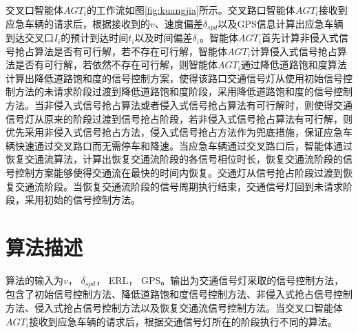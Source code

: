
交叉口智能体${AGT_i}$的工作流如图\ref{fig:kuangjia}所示。交叉路口智能体${AGT_i}$接收到应急车辆的请求后，根据接收到的${v}$、速度偏差${\delta_{spd}}$以及GPS信息计算出应急车辆到达交叉口${I_i}$的预计到达时间${t_i}$以及时间偏差${\delta_{i}}$。智能体${AGT_i}$首先计算非侵入式信号抢占算法是否有可行解，若不存在可行解，智能体${AGT_i}$计算侵入式信号抢占算法是否有可行解，若依然不存在可行解，则智能体${AGT_i}$通过降低道路饱和度算法计算出降低道路饱和度的信号控制方案，使得该路口交通信号灯从使用初始信号控制方法的未请求阶段过渡到降低道路饱和度阶段，采用降低道路饱和度的信号控制方法。当非侵入式信号抢占算法或者侵入式信号抢占算法有可行解时，则使得交通信号灯从原来的阶段过渡到信号抢占阶段，若非侵入式信号抢占算法有可行解，则优先采用非侵入式信号抢占方法，侵入式信号抢占方法作为兜底措施，保证应急车辆快速通过交叉路口而无需停车和降速。当应急车辆通过交叉路口后，智能体通过恢复交通流算法，计算出恢复交通流阶段的各信号相位时长，恢复交通流阶段的信号控制方案能够使得交通流在最快的时间内恢复。交通灯从信号抢占阶段过渡到恢复交通流阶段。当恢复交通流阶段的信号周期执行结束，交通信号灯回到未请求阶段，采用初始的信号控制方法。



\section{算法描述}
算法的输入为${v}$， ${\delta_{spd}}$， ERL， GPS。输出为交通信号灯采取的信号控制方法，包含了初始信号控制方法、降低道路饱和度信号控制方法、非侵入式抢占信号控制方法、侵入式抢占信号控制方法以及恢复交通流信号控制方法。当交叉口智能体${AGT_i}$接收到应急车辆的请求后，根据交通信号灯所在的阶段执行不同的算法。

